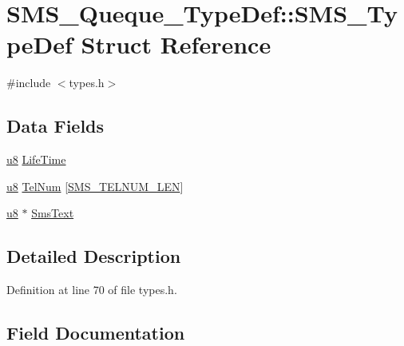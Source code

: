 \hypertarget{struct_s_m_s___queque___type_def_1_1_s_m_s___type_def}{}\section{S\+M\+S\+\_\+\+Queque\+\_\+\+Type\+Def\+:\+:S\+M\+S\+\_\+\+Type\+Def Struct Reference}
\label{struct_s_m_s___queque___type_def_1_1_s_m_s___type_def}


{\ttfamily \#include $<$types.\+h$>$}

\subsection*{Data Fields}
\begin{DoxyCompactItemize}
\item 
\hyperlink{types_8h_aed742c436da53c1080638ce6ef7d13de}{u8} \hyperlink{struct_s_m_s___queque___type_def_1_1_s_m_s___type_def_a455e8cf5aa85d24b7016183cfbaf4160}{Life\+Time}
\item 
\hyperlink{types_8h_aed742c436da53c1080638ce6ef7d13de}{u8} \hyperlink{struct_s_m_s___queque___type_def_1_1_s_m_s___type_def_a0a579b08ecf1475050993cc022879540}{Tel\+Num} \mbox{[}\hyperlink{types_8h_a5e892833bdd80f5cb5cb76edc5cfa7e1}{S\+M\+S\+\_\+\+T\+E\+L\+N\+U\+M\+\_\+\+L\+E\+N}\mbox{]}
\item 
\hyperlink{types_8h_aed742c436da53c1080638ce6ef7d13de}{u8} $\ast$ \hyperlink{struct_s_m_s___queque___type_def_1_1_s_m_s___type_def_aaa5626d5395532caeb6f03a42afc0b7c}{Sms\+Text}
\end{DoxyCompactItemize}


\subsection{Detailed Description}


Definition at line 70 of file types.\+h.



\subsection{Field Documentation}
\hypertarget{struct_s_m_s___queque___type_def_1_1_s_m_s___type_def_a455e8cf5aa85d24b7016183cfbaf4160}{}
